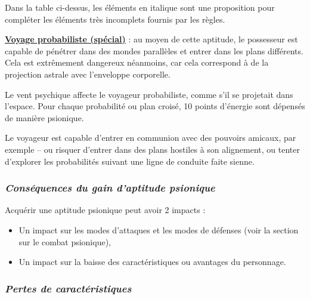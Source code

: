 \bigskip

Dans la table ci-dessus, les éléments en italique sont une proposition pour compléter les éléments très incomplets fournis par les règles.

\bigskip

\textbf{\uline{Voyage probabiliste (spécial)}} : au moyen de cette aptitude, le possesseur est capable de pénétrer dans des mondes parallèles et entrer dans les plans différents. Cela est extrêmement dangereux néanmoins, car cela correspond à de la projection astrale avec l'enveloppe corporelle.

\bigskip

Le vent psychique affecte le voyageur probabiliste, comme s'il se projetait dans l'espace. Pour chaque probabilité ou plan croisé, 10 points d'énergie sont dépensés de manière psionique.

\bigskip

Le voyageur est capable d'entrer en communion avec des pouvoirs amicaux, par exemple -- ou risquer d'entrer dans des plans hostiles à son alignement, ou tenter d'explorer les probabilités suivant une ligne de conduite faite sienne.

\newpage
\subsubsection*{\textit{Conséquences du gain d'aptitude psionique}}

Acquérir une aptitude psionique peut avoir 2 impacts :
\begin{itemize}
\item Un impact sur les modes d'attaques et les modes de défenses (voir la section sur le combat psionique),
\item Un impact sur la baisse des caractéristiques ou avantages du personnage.
\end{itemize}

\subsubsection*{\textit{Pertes de caractéristiques}}

